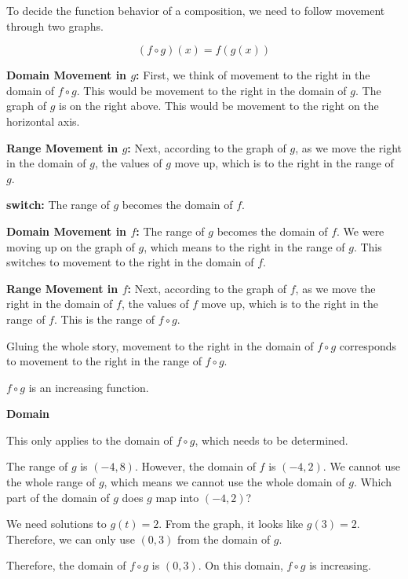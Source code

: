 \documentclass{ximera}
\begin{document}
To decide the function behavior of a composition, we need to follow movement through two graphs. 



\[
(f \circ g)(x) = f(g(x))
\]



\textbf{\textcolor{blue!55!black}{Domain Movement in $g$:}}  First, we think of movement to the right in the domain of $f \circ g$.  This would be movement to the right in the domain of $g$.  The graph of $g$ is on the right above.  This would be movement to the right on the horizontal axis.



\textbf{\textcolor{blue!55!black}{Range Movement in $g$:}}  Next, according to the graph of $g$, as we move the right in the domain of $g$, the values of $g$ move up, which is to the right in the range of $g$.




\textbf{\textcolor{blue!55!black}{switch:}}   The range of $g$ becomes the domain of $f$.  


\textbf{\textcolor{blue!55!black}{Domain Movement in $f$:}}   The range of $g$ becomes the domain of $f$.  We were moving up on the graph of $g$, which means to the right in the range of $g$.  This switches to movement to the right in the domain of $f$.


\textbf{\textcolor{blue!55!black}{Range Movement in $f$:}}  Next, according to the graph of $f$, as we move the right in the domain of $f$, the values of $f$ move up, which is to the right in the range of $f$.  This is the range of $f \circ g$.




Gluing the whole story, movement to the right in the domain of $f \circ g$ corresponds to movement to the right in the range of $f \circ g$.

$f \circ g$ is an increasing function.



\begin{observation} \textbf{\textcolor{-red!75}{Domain}}


This only applies to the domain of $f \circ g$, which needs to be determined. 



The range of $g$ is $(-4, 8)$.  However, the domain of $f$ is $(-4, 2)$.   We cannot use the whole range of $g$, which means we cannot use the whole domain of $g$.  Which part of the domain of $g$ does $g$ map into $(-4, 2)$? 


We need solutions to $g(t) = 2$.  From the graph, it looks like $g(3) = 2$.  Therefore, we can only use $(0, 3)$ from the domain of $g$.


Therefore, the domain of $f \circ g$ is $(0, 3)$.  On this domain, $f \circ g$ is increasing.



\end{observation}
\end{document}
